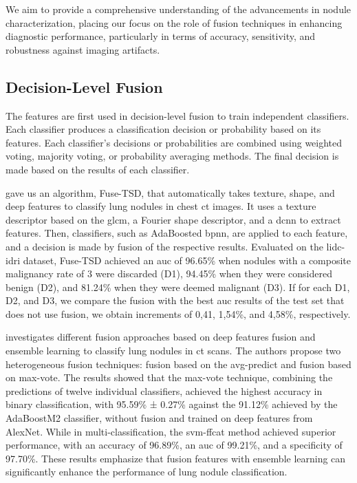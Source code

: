 We aim to provide a comprehensive understanding of the advancements in nodule characterization, placing our focus on the role of fusion techniques in enhancing diagnostic performance, particularly in terms of accuracy, sensitivity, and robustness against imaging artifacts.


\subsection{Decision-Level Fusion}
The features are first used in decision-level fusion to train independent classifiers. Each classifier produces a classification decision or probability based on its features.
Each classifier's decisions or probabilities are combined using weighted voting, majority voting, or probability averaging methods.
The final decision is made based on the results of each classifier.

\textcite{xie_fusing_2018} gave us an algorithm, Fuse-TSD, that automatically takes texture, shape, and deep features to classify lung nodules in chest \ac{ct} images. It uses a texture descriptor based on the \ac{glcm}, a Fourier shape descriptor, and a \ac{dcnn} to extract features. Then, classifiers, such as AdaBoosted \ac{bpnn}, are applied to each feature, and a decision is made by fusion of the respective results. Evaluated on the \ac{lidc-idri} dataset, Fuse-TSD achieved an \ac{auc} of 96.65\% when nodules with a composite malignancy rate of 3 were discarded (D1), 94.45\% when they were considered benign (D2), and 81.24\% when they were deemed malignant (D3). If for each D1, D2, and D3, we compare the fusion with the best \ac{auc} results of the test set that does not use fusion, we obtain increments of 0,41, 1,54\%, and 4,58\%, respectively.

\textcite{muzammil_pulmonary_2021} investigates different fusion approaches based on deep features fusion and ensemble learning to classify lung nodules in \ac{ct} scans. The authors propose two heterogeneous fusion techniques: fusion based on the \ac{avg-predict} and fusion based on \ac{max-vote}. The results showed that the \ac{max-vote} technique, combining the predictions of twelve individual classifiers, achieved the highest accuracy in binary classification, with 95.59\% ± 0.27\% against the 91.12\% achieved by the AdaBoostM2 classifier, without fusion and trained on deep features from AlexNet. While in multi-classification, the \ac{svm-ffcat} method achieved superior performance, with an accuracy of 96.89\%, an \ac{auc} of 99.21\%, and a specificity of 97.70\%. These results emphasize that fusion features with ensemble learning can significantly enhance the performance of lung nodule classification.

